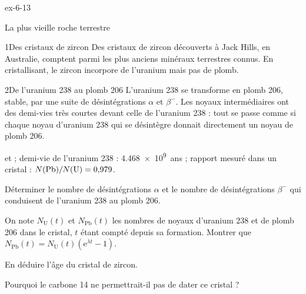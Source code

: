 \begin{blocLivre}{ex-6-13}
\begin{exercice}[3]{La plus vieille roche terrestre}
\begin{docu}{1}{Des cristaux de zircon}
Des cristaux de zircon découverts à Jack Hills, en Australie, comptent parmi les plus anciens minéraux terrestres
connus. En cristallisant, le zircon incorpore de l'uranium mais pas de plomb.
\end{docu}
\begin{docu}{2}{De l'uranium 238 au plomb 206}
L'uranium 238 se transforme en plomb 206, stable, par une suite de désintégrations $\alpha$ et $\beta^-$. Les noyaux
intermédiaires ont des demi-vies très courtes devant celle de l'uranium 238 : tout se passe comme si chaque noyau
d'uranium 238 qui se désintègre donnait directement un noyau de plomb 206.
\end{docu}
\begin{donnees}
 et  ; demi-vie de l'uranium 238 : \num{4.468e9}~ans ; rapport mesuré dans un
cristal : \mbox{$N(\ce{Pb})/N(\ce{U})=0{,}979$}.
\end{donnees}
\begin{questions}
\item \initiative Déterminer le nombre de désintégrations $\alpha$ et le nombre de désintégrations $\beta^-$ qui
conduisent de l'uranium 238 au plomb 206.
\item On note $N_\mathrm{U}(t)$ et $N_\mathrm{Pb}(t)$ les nombres de noyaux d'uranium 238 et de plomb 206 dans le
cristal, $t$ étant compté depuis sa formation. Montrer que $N_\mathrm{Pb}(t)=N_\mathrm{U}(t)\left(\mathrm{e}^{\lambda t}-1\right)$.
\item En déduire l'âge du cristal de zircon.
\item Pourquoi le carbone 14 ne permettrait-il pas de dater ce cristal ?
\end{questions}
\end{exercice}
\end{blocLivre}
